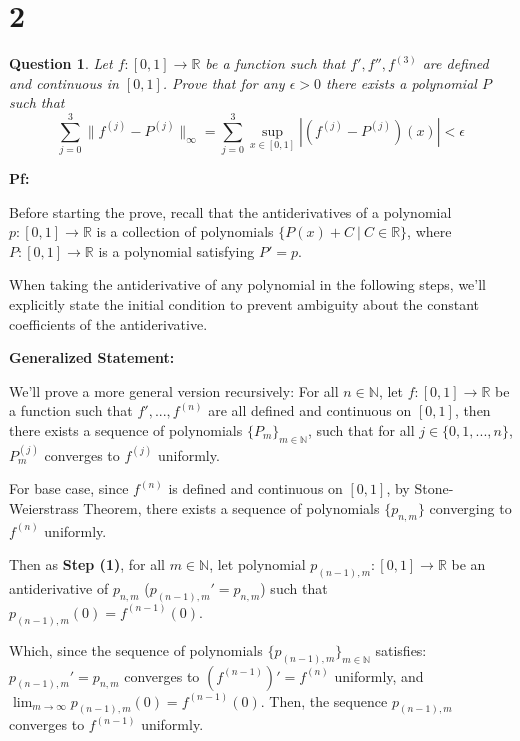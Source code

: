 \documentclass{article}
\newtheorem{question}{Question}
\begin{document}
\hfill

\hfill

\section*{2}
\begin{myBox}[]{}
    \begin{question}
        Let $f:[0,1]\rightarrow\mathbb{R}$ be a function such that $f',f'',f^{(3)}$ are defined and continuous in $[0,1]$.
        Prove that for any $\epsilon>0$ there exists a polynomial $P$ such that
        $$\sum_{j=0}^{3}\|f^{(j)}-P^{(j)}\|_\infty = \sum_{j=0}^{3}\sup_{x\in[0,1]}|(f^{(j)}-P^{(j)})(x)|<\epsilon$$
    \end{question}
\end{myBox}

\textbf{Pf:}

Before starting the prove, recall that the antiderivatives of a polynomial $p:[0,1]\rightarrow\mathbb{R}$ is a collection of polynomials $\{P(x)+C\ |\ C\in\mathbb{R}\}$, 
where $P:[0,1]\rightarrow\mathbb{R}$ is a polynomial satisfying $P'=p$.

When taking the antiderivative of any polynomial in the following steps, we'll explicitly state the initial condition to prevent ambiguity about the constant coefficients of the antiderivative.

\hfill

\textbf{Generalized Statement:}

We'll prove a more general version recursively: For all $n\in\mathbb{N}$, let $f:[0,1]\rightarrow\mathbb{R}$ be a function such that $f',...,f^{(n)}$ are all defined and continuous on $[0,1]$,
then there exists a sequence of polynomials $\{P_m\}_{m\in\mathbb{N}}$, such that for all $j\in\{0,1,...,n\}$, $P_m^{(j)}$ converges to $f^{(j)}$ uniformly.

\hfill

For base case, since $f^{(n)}$ is defined and continuous on $[0,1]$, by Stone-Weierstrass Theorem, there exists a sequence of polynomials $\{p_{n,m}\}$ converging to $f^{(n)}$ uniformly.

Then as \textbf{Step (1)}, for all $m\in\mathbb{N}$, let polynomial $p_{(n-1),m}:[0,1]\rightarrow\mathbb{R}$ be an antiderivative of $p_{n,m}$ ($p_{(n-1),m}'=p_{n,m}$) such that $p_{(n-1),m}(0) = f^{(n-1)}(0)$.

Which, since the sequence of polynomials $\{p_{(n-1),m}\}_{m\in\mathbb{N}}$ satisfies: $p_{(n-1),m}' = p_{n,m}$ converges to $(f^{(n-1)})' = f^{(n)}$ uniformly, and $\lim_{m\rightarrow\infty}p_{(n-1),m}(0) = f^{(n-1)}(0)$.
Then, the sequence $p_{(n-1),m}$ converges to $f^{(n-1)}$ uniformly.
\end{document}
